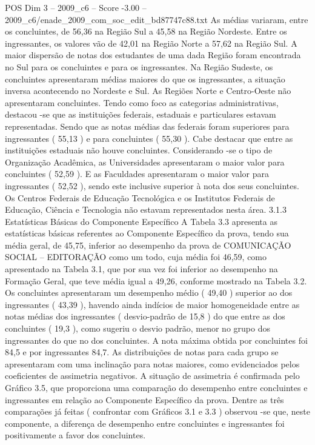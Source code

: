 \begin{textsample}{POS Dim 3 – 2009\_c6 – Score -3.00 – 2009\_c6/enade\_2009\_com\_soc\_edit\_bd87747c88.txt}
As médias variaram, entre os concluintes, de 56,36 na Região Sul a 45,58 na Região Nordeste.
Entre os ingressantes, os valores vão de 42,01 na Região Norte a 57,62 na Região Sul.
A maior dispersão de notas dos estudantes de uma dada Região foram encontrada no Sul para os concluintes e para os ingressantes.
Na Região Sudeste, os concluintes apresentaram médias maiores do que os ingressantes, a situação inversa acontecendo no Nordeste e Sul.
As Regiões Norte e Centro-Oeste não apresentaram concluintes.
Tendo como foco as categorias administrativas, destacou -se que as instituições federais, estaduais e particulares estavam representadas.
Sendo que as notas médias das federais foram superiores para ingressantes ( 55,13 ) e para concluintes ( 55,30 ).
Cabe destacar que entre as instituições estaduais não houve concluintes.
Considerando -se o tipo de Organização Acadêmica, as Universidades apresentaram o maior valor para concluintes ( 52,59 ).
E as Faculdades apresentaram o maior valor para ingressantes ( 52,52 ), sendo este inclusive superior à nota dos seus concluintes.
Os Centros Federais de Educação Tecnológica e os Institutos Federais de Educação, Ciência e Tecnologia não estavam representados nesta área. 3.1.3 Estatísticas Básicas do Componente Específico A Tabela 3.3 apresenta as estatísticas básicas referentes ao Componente Específico da prova, tendo sua média geral, de 45,75, inferior ao desempenho da prova de COMUNICAÇÃO SOCIAL – EDITORAÇÃO como um todo, cuja média foi 46,59, como apresentado na Tabela 3.1, que por sua vez foi inferior ao desempenho na Formação Geral, que teve média igual a 49,26, conforme mostrado na Tabela 3.2.
Os concluintes apresentaram um desempenho médio ( 49,40 ) superior ao dos ingressantes ( 43,39 ), havendo ainda indícios de maior homogeneidade entre as notas médias dos ingressantes ( desvio-padrão de 15,8 ) do que entre as dos concluintes ( 19,3 ), como sugeriu o desvio padrão, menor no grupo dos ingressantes do que no dos concluintes.
A nota máxima obtida por concluintes foi 84,5 e por ingressantes 84,7.
As distribuições de notas para cada grupo se apresentaram com uma inclinação para notas maiores, como evidenciados pelos coeficientes de assimetria negativos.
A situação de assimetria é confirmada pelo Gráfico 3.5, que proporciona uma comparação do desempenho entre concluintes e ingressantes em relação ao Componente Específico da prova.
Dentre as três comparações já feitas ( confrontar com Gráficos 3.1 e 3.3 ) observou -se que, neste componente, a diferença de desempenho entre concluintes e ingressantes foi positivamente a favor dos concluintes.

\end{textsample}

